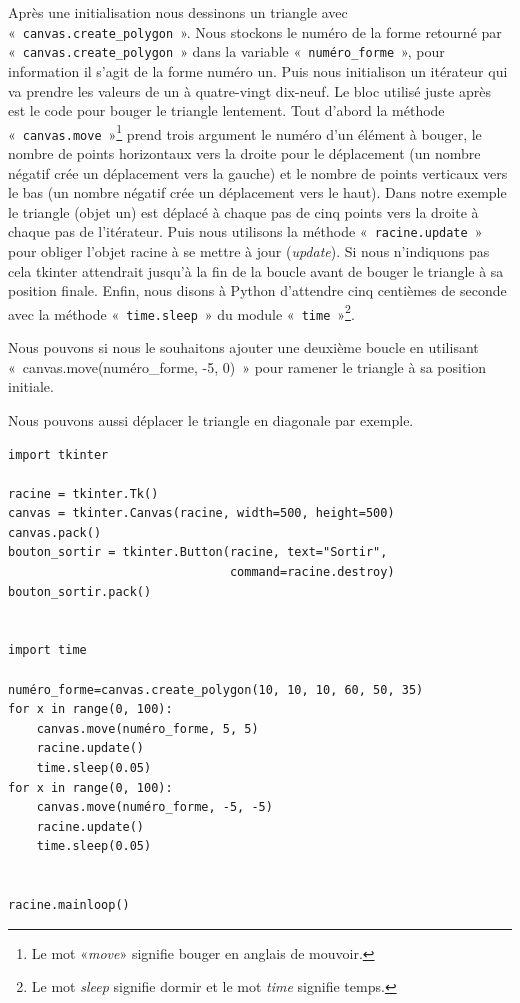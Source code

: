 Après une initialisation nous dessinons un triangle avec «~\texttt{canvas.create\_polygon}~». 
Nous stockons le numéro de la forme retourné par «~\texttt{canvas.create\_polygon}~» dans la variable «~\texttt{numéro\_forme}~», pour information il s'agit de la forme numéro un.
Puis nous initialison un itérateur qui va prendre les valeurs de un à quatre-vingt dix-neuf. Le bloc utilisé juste après est le code pour bouger le triangle lentement. Tout d'abord la méthode «~\texttt{canvas.move}~»\footnote{Le mot «\emph{move}» signifie bouger en anglais de mouvoir.}  prend trois argument le numéro d'un élément à bouger, le nombre de points horizontaux vers la droite pour le déplacement (un nombre négatif crée un déplacement vers la gauche) et le nombre de points verticaux vers le bas (un nombre négatif crée un déplacement vers le haut). Dans notre exemple le triangle (objet un) est déplacé à chaque pas de cinq points vers la droite à chaque pas de l'itérateur.  
Puis nous utilisons la méthode «~\texttt{racine.update}~» pour obliger l'objet racine à se mettre à jour (\emph{update}). Si nous n'indiquons pas cela tkinter attendrait jusqu'à la fin de la boucle avant de bouger le triangle à sa position finale.  Enfin, nous disons à Python d'attendre cinq centièmes de seconde avec la méthode «~\texttt{time.sleep}~» du module «~\texttt{time}~»\footnote{Le mot \emph{sleep} signifie dormir et le mot \emph{time} signifie temps.}.

Nous pouvons si nous le souhaitons ajouter une deuxième boucle en utilisant  «~canvas.move(numéro\_forme, -5, 0)~»  pour ramener le triangle à sa position initiale.


Nous pouvons aussi déplacer le triangle en diagonale par exemple.

\begin{Verbatim}[frame=single,rulecolor=\color{mbleu}, label=à taper]
import tkinter

racine = tkinter.Tk()
canvas = tkinter.Canvas(racine, width=500, height=500)
canvas.pack()
bouton_sortir = tkinter.Button(racine, text="Sortir",
                               command=racine.destroy)
bouton_sortir.pack()


import time

numéro_forme=canvas.create_polygon(10, 10, 10, 60, 50, 35)
for x in range(0, 100):
    canvas.move(numéro_forme, 5, 5)
    racine.update()
    time.sleep(0.05)
for x in range(0, 100):
    canvas.move(numéro_forme, -5, -5)
    racine.update()
    time.sleep(0.05)


racine.mainloop()
\end{Verbatim}

